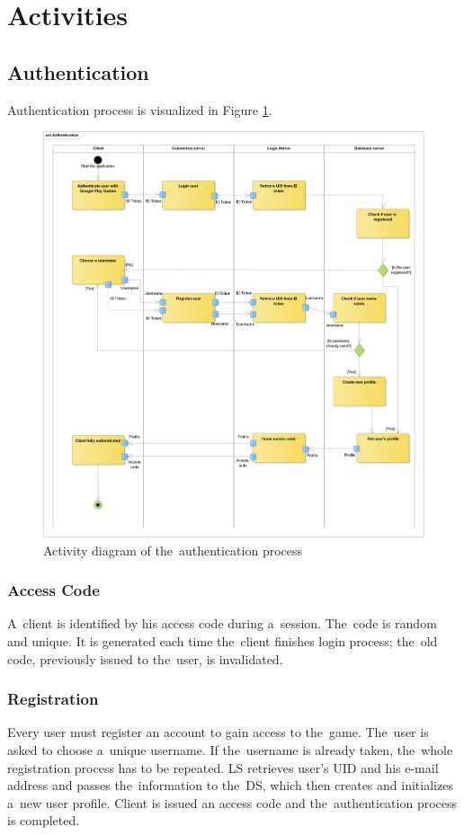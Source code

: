 \section{Activities}
	\subsection{Authentication}
	Authentication process is visualized in Figure \ref{fig:adauth}.
	
	\begin{figure}[h]	
		\includegraphics[width=\textwidth]{figures/AD_Authentication}
		\centering			
		\caption{Activity diagram of the~authentication process}
		\label{fig:adauth}
	\end{figure}

		\subsubsection{Access Code}
		A~client is identified by his access code during a~session. The~code is random and unique. It is generated each time the~client finishes login process; the~old code,  previously issued to the~user, is invalidated.
		
		\subsubsection{Registration}
		Every user must register an account to gain access to the~game. The~user is asked to choose a~unique username. If the~username is already taken, the~whole registration process has to be repeated. LS retrieves user's UID and his e-mail address and passes the~information to the~DS, which then creates and initializes a~new user profile. Client is issued an access code and the~authentication process is completed.
		
